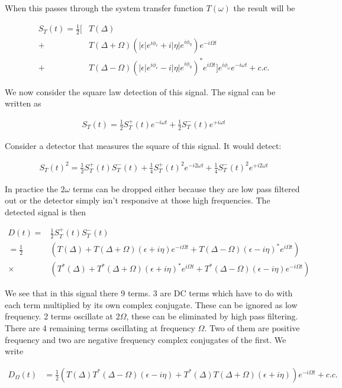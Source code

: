 \documentclass[12pt]{article}
\newcommand{\ep}{\epsilon}
\begin{document}
When this passes through the system transfer function $T(\omega)$ the result will be

\begin{align}
S_T(t) = \frac{1}{2}\Bigg[&T(\Delta)\\
+&T(\Delta + \Omega)(|\ep|e^{i\phi_{\ep}} + i |\eta|e^{i\phi_{\eta}})e^{-i\Omega t}\\
+&T(\Delta - \Omega)(|\ep|e^{i\phi_{\ep}} - i |\eta|e^{i\phi_{\eta}})^*e^{i\Omega t}\Bigg]e^{i\phi_{\omega}}e^{-i\omega t} + c.c.
\end{align}

We now consider the square law detection of this signal. The signal can be written as

\begin{align}
S_T(t) = \frac{1}{2}S_T^+(t)e^{-i\omega t} + \frac{1}{2}S_T^-(t)e^{+i\omega t}
\end{align}

Consider a detector that measures the square of this signal. It would detect:

\begin{align}
S_T(t)^2 = \frac{1}{2}S_T^+(t)S_T^-(t) + \frac{1}{4}S_T^+(t)^2e^{-i2\omega t} + \frac{1}{4}S_T^-(t)^2e^{+i2\omega t}
\end{align}

In practice the $2\omega$ terms can be dropped either because they are low pass filtered out or the detector simply isn't responsive at those high frequencies. The detected signal is then

\begin{align}
D(t) =& \frac{1}{2}S_T^+(t)S_T^-(t)\\
= \frac{1}{2}& \left(T(\Delta) + T(\Delta +\Omega)(\ep + i \eta)e^{-i\Omega t} + T(\Delta -\Omega)(\ep-i\eta)^*e^{i\Omega t} \right)\\
\times& \left(T^*(\Delta) + T^*(\Delta +\Omega)(\ep + i \eta)^*e^{i\Omega t} + T^*(\Delta -\Omega)(\ep-i\eta)e^{-i\Omega t} \right)
\end{align}

We see that in this signal there 9 terms. 3 are DC terms which have to do with each term multiplied by its own complex conjugate. These can be ignored as low frequency. 2 terms oscillate at $2\Omega$, these can be eliminated by high pass filtering. There are 4 remaining terms oscillating at frequency $\Omega$. Two of them are positive frequency and two are negative frequency complex conjugates of the first. We write

\begin{align}
D_{\Omega}(t) &= \frac{1}{2}\left(T(\Delta)T^*(\Delta-\Omega)(\ep-i\eta) + T^*(\Delta)T(\Delta+\Omega)(\ep+i\eta) \right)e^{-i\Omega t}+c.c.
\end{align}
\end{document}
